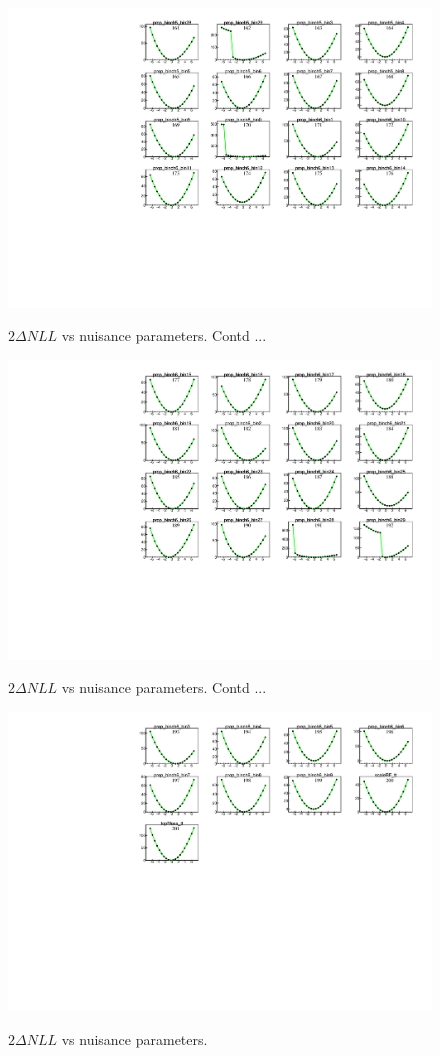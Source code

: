 \begin{figure}
    \centering  
    {\includegraphics[width=1.0\linewidth]{Image/MLFit/ScanNuis/scanNuis11.pdf}}
    \caption{  $2\Delta NLL$ vs nuisance parameters. Contd ...}
    \label{fig:nuisScan11}
\end{figure}
\begin{figure}
    \centering  
    {\includegraphics[width=1.0\linewidth]{Image/MLFit/ScanNuis/scanNuis12.pdf}}
    \caption{  $2\Delta NLL$ vs nuisance parameters. Contd ...}
    \label{fig:nuisScan12}
\end{figure}

\begin{figure}
    \centering  
    {\includegraphics[width=1.0\linewidth]{Image/MLFit/ScanNuis/scanNuis13.pdf}}
    \caption{  $2\Delta NLL$ vs nuisance parameters.}
    \label{fig:nuisScan13}
\end{figure}

